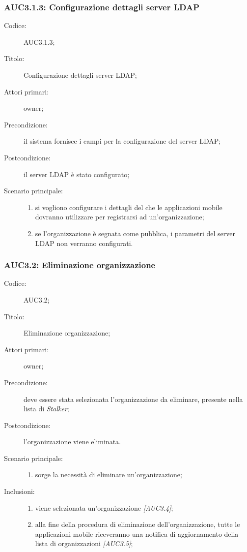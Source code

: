 \documentclass[../../../analisi-dei-requisiti.tex]{subfiles}
\begin{document}
\subsubsection{AUC3.1.3: Configurazione dettagli server LDAP}%
\label{subs:AUC3.1.3}
\begin{description}
  \item[Codice:] AUC3.1.3;
  \item[Titolo:] Configurazione dettagli server LDAP;
  \item[Attori primari:] owner;
  \item[Precondizione:] il sistema fornisce i campi per la configurazione del server LDAP;
  \item[Postcondizione:] il server LDAP è stato configurato;
  \item[Scenario principale:]
        \begin{enumerate}
          \item si vogliono configurare i dettagli del  che le applicazioni mobile dovranno utilizzare per registrarsi ad un'organizzazione;
          \item se l'organizzazione è segnata come pubblica, i parametri del server LDAP non verranno configurati.
        \end{enumerate}
\end{description}

\subsubsection{AUC3.2: Eliminazione organizzazione}%
\label{subs:AUC3.2}
\begin{description}
  \item[Codice:] AUC3.2;
  \item[Titolo:] Eliminazione organizzazione;
  \item[Attori primari:] owner;
  \item[Precondizione:] deve essere stata selezionata l'organizzazione da eliminare, presente nella lista di \emph{Stalker};
  \item[Postcondizione:] l'organizzazione viene eliminata.
  \item[Scenario principale:]
        \begin{enumerate}
          \item sorge la necessità di eliminare un'organizzazione;
        \end{enumerate}
  \item[Inclusioni:]
        \begin{enumerate}
          \item viene selezionata un'organizzazione \emph{[AUC3.4]};
          \item alla fine della procedura di eliminazione dell'organizzazione, tutte le applicazioni mobile riceveranno una notifica di aggiornamento della lista di organizzazioni \emph{[AUC3.5]};
        \end{enumerate}
\end{description}
\end{document}
